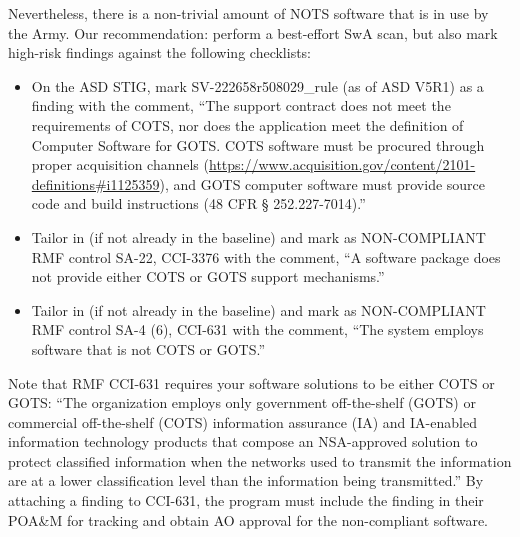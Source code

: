 Nevertheless, there is a non-trivial amount of NOTS software that is in use by the Army. Our recommendation: perform a best-effort SwA scan, but also mark high-risk findings against the following checklists:
\begin{itemize}
	\item On the ASD STIG, mark SV-222658r508029\_rule (as of ASD V5R1) as a finding with the comment, ``The support contract does not meet the requirements of COTS, nor does the application meet the definition of Computer Software for GOTS. COTS software must be procured through proper acquisition channels (\url{https://www.acquisition.gov/content/2101-definitions#i1125359}), and GOTS computer software must provide source code and build instructions (48 CFR § 252.227-7014).''
	\item Tailor in (if not already in the baseline) and mark as NON-COMPLIANT RMF control SA-22, CCI-3376 with the comment, ``A software package does not provide either COTS or GOTS support mechanisms.''
	\item Tailor in (if not already in the baseline) and mark as NON-COMPLIANT RMF control SA-4 (6), CCI-631 with the comment, ``The system employs software that is not COTS or GOTS.''
\end{itemize}

Note that RMF CCI-631 requires your software solutions to be either COTS or GOTS: ``The organization employs only government off-the-shelf (GOTS) or commercial off-the-shelf (COTS) information assurance (IA) and IA-enabled information technology products that compose an NSA-approved solution to protect classified information when the networks used to transmit the information are at a lower classification level than the information being transmitted.'' By attaching a finding to CCI-631, the program must include the finding in their POA\&M for tracking and obtain AO approval for the non-compliant software.
